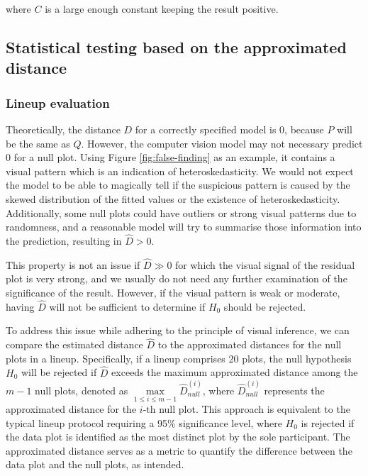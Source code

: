 \documentclass[]{interact}
\theoremstyle{plain}%
\theoremstyle{definition}
\theoremstyle{remark}
\begin{document}
\noindent where \(C\) is a large enough constant keeping the result
positive.

\subsection{Statistical testing based on the approximated
distance}\label{statistical-testing-based-on-the-approximated-distance}

\subsubsection{Lineup evaluation}\label{lineup-evaluation}

Theoretically, the distance \(D\) for a correctly specified model is
\(0\), because \(P\) will be the same as \(Q\). However, the computer
vision model may not necessary predict \(0\) for a null plot. Using
Figure \ref{fig:false-finding} as an example, it contains a visual
pattern which is an indication of heteroskedasticity. We would not
expect the model to be able to magically tell if the suspicious pattern
is caused by the skewed distribution of the fitted values or the
existence of heteroskedasticity. Additionally, some null plots could
have outliers or strong visual patterns due to randomness, and a
reasonable model will try to summarise those information into the
prediction, resulting in \(\hat{D} > 0\).

This property is not an issue if \(\hat{D} \gg 0\) for which the visual
signal of the residual plot is very strong, and we usually do not need
any further examination of the significance of the result. However, if
the visual pattern is weak or moderate, having \(\hat{D}\) will not be
sufficient to determine if \(H_0\) should be rejected.

To address this issue while adhering to the principle of visual
inference, we can compare the estimated distance \(\hat{D}\) to the
approximated distances for the null plots in a lineup. Specifically, if
a lineup comprises 20 plots, the null hypothesis \(H_0\) will be
rejected if \(\hat{D}\) exceeds the maximum approximated distance among
the \(m - 1\) null plots, denoted as
\(\max\limits_{1 \leq i \leq m-1} {\hat{D}_{null}^{(i)}}\), where
\(\hat{D}_{null}^{(i)}\) represents the approximated distance for the
\(i\)-th null plot. This approach is equivalent to the typical lineup
protocol requiring a 95\% significance level, where \(H_0\) is rejected
if the data plot is identified as the most distinct plot by the sole
participant. The approximated distance serves as a metric to quantify
the difference between the data plot and the null plots, as intended.
\end{document}
